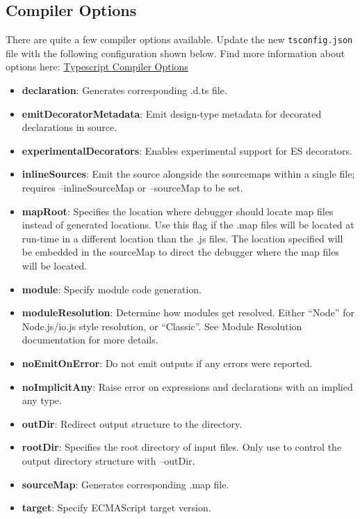 \documentclass[]{book}
\providecommand{\tightlist}{%
  \setlength{\itemsep}{0pt}\setlength{\parskip}{0pt}}
\theoremstyle{definition}
\theoremstyle{definition}
\theoremstyle{definition}
\theoremstyle{remark}
\begin{document}
\subsection{Compiler Options}\label{compiler-options}

There are quite a few compiler options available. Update the new
\texttt{tsconfig.json} file with the following configuration shown
below. Find more information about options here:
\href{https://www.typescriptlang.org/docs/handbook/compiler-options.html}{Typescript
Compiler Options}

\begin{itemize}
\tightlist
\item
  \textbf{declaration}: Generates corresponding .d.ts file.
\item
  \textbf{emitDecoratorMetadata}: Emit design-type metadata for
  decorated declarations in source.
\item
  \textbf{experimentalDecorators}: Enables experimental support for ES
  decorators.
\item
  \textbf{inlineSources}: Emit the source alongside the sourcemaps
  within a single file; requires --inlineSourceMap or --sourceMap to be
  set.
\item
  \textbf{mapRoot}: Specifies the location where debugger should locate
  map files instead of generated locations. Use this flag if the .map
  files will be located at run-time in a different location than the .js
  files. The location specified will be embedded in the sourceMap to
  direct the debugger where the map files will be located.
\item
  \textbf{module}: Specify module code generation.
\item
  \textbf{moduleResolution}: Determine how modules get resolved. Either
  ``Node'' for Node.js/io.js style resolution, or ``Classic''. See
  Module Resolution documentation for more details.
\item
  \textbf{noEmitOnError}: Do not emit outputs if any errors were
  reported.
\item
  \textbf{noImplicitAny}: Raise error on expressions and declarations
  with an implied any type.
\item
  \textbf{outDir}: Redirect output structure to the directory.
\item
  \textbf{rootDir}: Specifies the root directory of input files. Only
  use to control the output directory structure with --outDir.
\item
  \textbf{sourceMap}: Generates corresponding .map file.
\item
  \textbf{target}: Specify ECMAScript target version.
\end{itemize}
\end{document}
